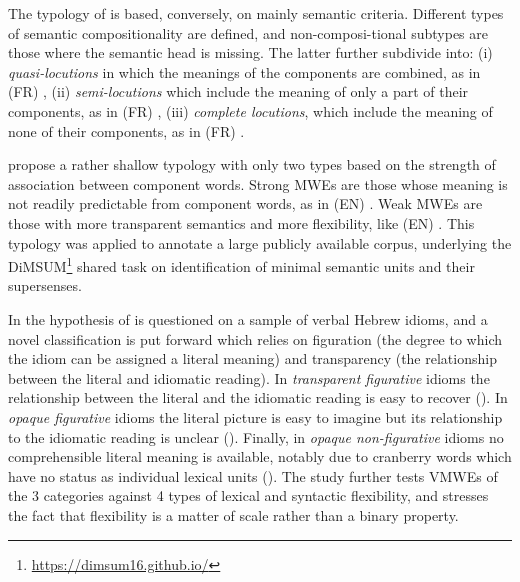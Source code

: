 \documentclass[output=paper,modfonts]{langscibook}
\begin{document}
The typology of \citet{Melcuk10} is based, conversely, on mainly semantic criteria. Different types of semantic compositionality are defined, and non-composi-tional subtypes are those where the semantic head is missing. The latter further subdivide into: (i) \emph{quasi-locutions} in which the meanings of the components are combined, as in (FR) , (ii) \emph{semi-locutions} which include the meaning of only a part of their components, as in (FR) , (iii) \emph{complete locutions}, which include the meaning of none of their components, as in (FR) .

\citet{schneider2014} propose a rather shallow typology with only two types based on the strength of association between component words. Strong MWEs are those whose meaning is not readily predictable from component words, as in (EN) . Weak MWEs are those with more transparent semantics and more flexibility, like (EN) . This typology was applied to annotate a large publicly available corpus, underlying the DiMSUM\footnote{\url{https://dimsum16.github.io/}} shared task on identification of minimal semantic units and their supersenses.

In \citet{Sheinfux17} the  hypothesis of \citet{nunberg-94} is questioned on a sample of verbal Hebrew idioms, and a novel classification is put forward which relies on figuration (the degree to which the idiom can be assigned a literal meaning) and transparency (the relationship between the literal and idiomatic reading). In \emph{transparent figurative} idioms the relationship between the literal and the idiomatic reading is easy to recover (). In \emph{opaque figurative} idioms the literal picture is easy to imagine but its relationship to the idiomatic reading is unclear (). Finally, in \emph{opaque non-figurative} idioms no comprehensible literal meaning is available, notably due to cranberry words which have no status as individual lexical units (). The study further tests VMWEs of the 3 categories against 4 types of lexical and syntactic flexibility, and stresses the fact that flexibility is a matter of scale rather than a binary property.
\end{document}
